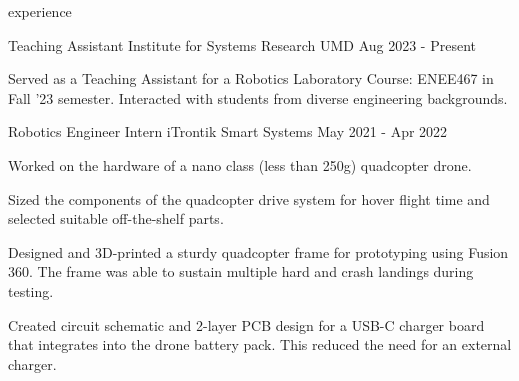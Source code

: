 \begin{section}{experience}

  \begin{work}
    {Teaching Assistant}
    {Institute for Systems Research}
    {UMD}
    {Aug 2023 - Present}

    \item Served as a Teaching Assistant for a Robotics Laboratory Course:
          ENEE467 in Fall '23 semester. Interacted with students from
          diverse engineering backgrounds.


  
  \end{work}

  \begin{work}
    {Robotics Engineer Intern}
    {iTrontik Smart Systems}
    {}
    {May 2021 - Apr 2022}

    \item Worked on the hardware of a nano class (less than 250g) quadcopter drone.
    \item Sized the components of the quadcopter drive system for hover flight time and selected suitable off-the-shelf parts. 
    \item Designed and 3D-printed a sturdy quadcopter frame for prototyping using Fusion 360. 
          The frame was able to sustain multiple hard and crash landings during testing.
    \item Created circuit schematic and 2-layer PCB design for a USB-C charger board that integrates into
          the drone battery pack. This reduced the need for an external charger.
  
  \end{work}

\end{section}